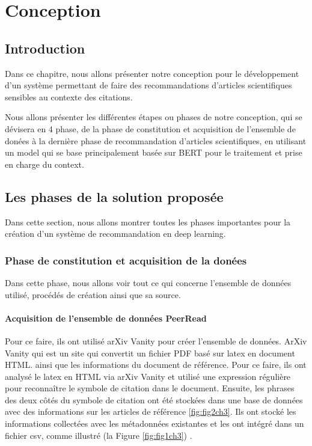 \chapter{\textbf{Conception}}\label{chapitre3}

\section{Introduction}
\par Dans ce chapitre, nous allons présenter notre conception pour le développement d'un système permettant de faire des recommandations d'articles scientifiques sensibles au contexte des citations.

Nous allons présenter les différentes étapes ou phases de notre conception, qui se dévisera en 4 phase, de la phase de constitution et acquisition de l'ensemble de donées à la dernière phase de recommandation d'articles scientifiques, en utilisant un model qui se base principalement basée sur BERT pour le traitement et prise en charge du context.

\section{Les phases de la solution proposée}
\par Dans cette section, nous allons montrer toutes les phases importantes pour la création d'un système de recommandation en deep learning.
    
    \subsection{Phase de constitution et acquisition de la donées }
    \par Dans cette phase, nous allons voir tout ce qui concerne l'ensemble de données utilisé, procédés de création ainsi que sa source.  
    
        \subsubsection{Acquisition de l'ensemble de données PeerRead} Pour ce faire, ils ont utilisé arXiv Vanity \cite{arXiv} pour créer l'ensemble de données. ArXiv Vanity qui est un site qui convertit un fichier PDF basé sur latex en document HTML. ainsi que les informations du document de référence. Pour ce faire, ils ont analysé le latex en HTML via arXiv Vanity et utilisé une expression régulière pour reconnaître le symbole de citation dans le document. Ensuite, les phrases des deux côtés du symbole de citation ont été stockées dans une base de données avec des informations sur les articles de référence \ref{fig:fig2ch3}. Ils ont stocké les informations collectées avec les métadonnées existantes et les ont intégré dans un fichier csv, comme illustré (la Figure \ref{fig:fig1ch3})  \cite{ch1ref8, peerread, peerreadgit}.
        
